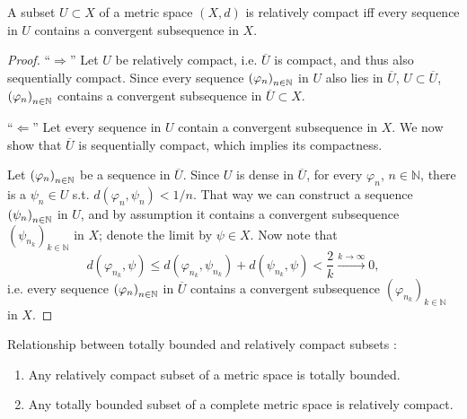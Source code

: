 \begin{theorem}
	A subset $U\subset X$ of a metric space $(X, d)$ is relatively compact iff every sequence in $U$ contains a convergent subsequence in $X$.
\end{theorem}

\begin{proof}
	\enquote{$\Longrightarrow$} Let $U$ be relatively compact, i.e. $\overline{U}$ is compact, and thus also sequentially compact. Since every sequence $\seq[\varphi_n]$ in $U$ also lies in $\overline{U}$, $U\subset \overline{U}$, $\seq[\varphi_n]$ contains a convergent subsequence in $\overline{U}\subset X$.
	
	\enquote{$\Longleftarrow$} Let every sequence in $U$ contain a convergent subsequence in $X$. We now show that $\overline{U}$ is sequentially compact, which implies its compactness.
	
	Let $\seq[\varphi_n]$ be a sequence in $\overline{U}$. Since $U$ is dense in $\overline{U}$, for every $\varphi_n$, $n\in\mathbb N$, there is a $\psi_n\in U$ s.t. $d(\varphi_n, \psi_n) < 1/n$. That way we can construct a sequence $\seq[\psi_n]$ in $U$, and by assumption it contains a convergent subsequence $\left(\psi_{n_k}\right)_{k\in\mathbb N}$ in $X$; denote the limit by $\psi\in X$. Now note that
	$$d(\varphi_{n_k}, \psi) \leq d(\varphi_{n_k}, \psi_{n_k}) + d(\psi_{n_k}, \psi) < \frac{2}{k} \overset{k\to\infty}{\longrightarrow} 0,$$ i.e. every sequence $\seq[\varphi_n]$ in $\overline{U}$ contains a convergent subsequence $\left(\varphi_{n_k}\right)_{k\in\mathbb N}$ in $X$.
\end{proof}

\begin{theorem}
	Relationship between totally bounded and relatively compact subsets \cite[Theorem 4.27]{src:relative_compactness}:
	\begin{enumerate}[label=(\alph*)]
		\item Any relatively compact subset of a metric space is totally bounded.
		\item Any totally bounded subset of a complete metric space is relatively compact.
	\end{enumerate}
\end{theorem}

